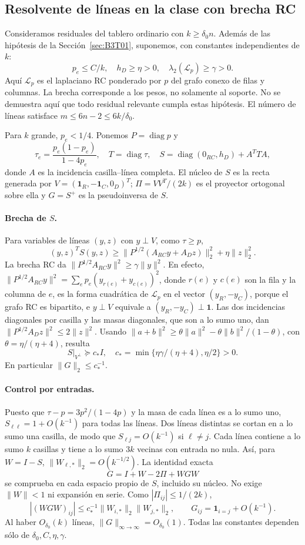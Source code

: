 \subsection{Resolvente de líneas en la clase con brecha RC}\label{sec:B3T05}
Consideramos residuales del tablero ordinario con $k\ge\delta_0 n$. Además de las hipótesis de la
Sección~\ref{sec:B3T01}, suponemos, con constantes independientes de $k$:
\[
 p_e\le C/k,\quad h_D\ge\eta>0,\quad
 \lambda_2(\mathscr L_p)\ge\gamma>0.
\]
Aquí $\mathscr L_p$ es el laplaciano RC ponderado por $p$ del grafo
conexo de filas y columnas. La brecha corresponde a los pesos,
no solamente al soporte. No se demuestra aquí que todo residual
relevante cumpla estas hipótesis. El número de líneas satisface
$m\le6n-2\le6k/\delta_0$.

Para $k$ grande, $p_e<1/4$. Ponemos $P=\operatorname{diag}p$ y
\[
 \tau_e=\frac{p_e(1-p_e)}{1-4p_e},\quad T=\operatorname{diag}\tau,
 \quad S=\operatorname{diag}(0_{RC},h_D)+A^TTA,
\]
donde $A$ es la incidencia casilla--línea completa.
El núcleo de $S$ es la recta generada por $V=(\mathbf1_R,-\mathbf1_C,0_D)^T$;
$\Pi=VV^T/(2k)$ es el proyector ortogonal sobre ella y $G=S^+$ es la pseudoinversa de $S$.
\paragraph{Brecha de $S$.}
Para variables de líneas $(y,z)$ con $y\perp V$, como $\tau\ge p$,
\[
 (y,z)^TS(y,z)\ge
 \|P^{1/2}(A_{RC}y+A_Dz)\|_2^2+\eta\|z\|_2^2.
\]
La brecha RC da $\|P^{1/2}A_{RC}y\|^2\ge\gamma\|y\|^2$.
En efecto, $\|P^{1/2}A_{RC}y\|^2=\sum_ep_e(y_{r(e)}+y_{c(e)})^2$, donde $r(e)$ y $c(e)$ son la fila
y la columna de $e$, es la forma cuadrática de $\mathscr L_p$ en el vector $(y_R,-y_C)$, porque el
grafo RC es bipartito, e $y\perp V$ equivale a $(y_R,-y_C)\perp\mathbf1$.
Las dos incidencias diagonales por casilla y las masas diagonales, que son a lo sumo uno, dan
$\|P^{1/2}A_Dz\|^2\le2\|z\|^2$.
Usando $\|a+b\|^2\ge\theta\|a\|^2-\theta\|b\|^2/(1-\theta)$,
con $\theta=\eta/(\eta+4)$, resulta
\[
 S|_{V^\perp}\succeq c_* I,\quad
 c_*=\min\{\eta\gamma/(\eta+4),\eta/2\}>0.
\]
En particular $\|G\|_2\le c_*^{-1}$.

\paragraph{Control por entradas.}
Puesto que $\tau-p=3p^2/(1-4p)$ y la masa de cada línea es a lo sumo uno,
$S_{\ell\ell}=1+O(k^{-1})$ para todas las líneas.
Dos líneas distintas se cortan en a lo sumo una casilla, de modo que
$S_{\ell j}=O(k^{-1})$ si $\ell\ne j$. Cada línea contiene a lo sumo
$k$ casillas y tiene a lo sumo $3k$ vecinas con entrada no nula.
Así, para $W=I-S$, $\|W_{\ell,*}\|_2=O(k^{-1/2})$.
La identidad exacta
\[
 G=I+W-2\Pi+WGW
\]
se comprueba en cada espacio propio de $S$, incluido su núcleo.
No exige $\|W\|<1$ ni expansión en serie.
Como $|\Pi_{ij}|\le1/(2k)$,
\[
 |(WGW)_{ij}|\le c_*^{-1}\|W_{i,*}\|_2\|W_{j,*}\|_2,
 \qquad \boxed{G_{ij}=\mathbf1_{i=j}+O(k^{-1}).}
\]
Al haber $O_{\delta_0}(k)$ líneas, $\|G\|_{\infty\to\infty}=O_{\delta_0}(1)$.
Todas las constantes dependen sólo de $\delta_0,C,\eta,\gamma$.

